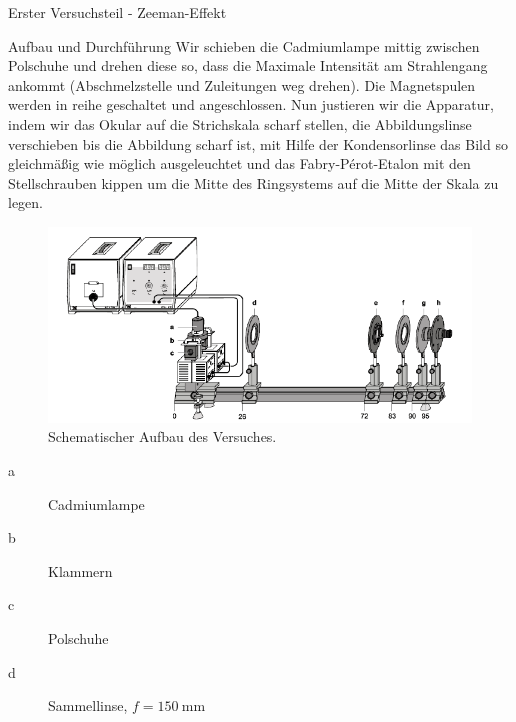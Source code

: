 \documentclass[pdftex, a4paper,11pt, twoside, ngerman]{report}
\begin{document}
         
         
  \begin{chapter}{Erster Versuchsteil - Zeeman-Effekt}
    \label{chp:Photoeffekt}
   
   
   
    \begin{section}{Aufbau und Durchführung}
      \label{chp:photoeffekt:sec:AufbauJustage}
      Wir schieben die Cadmiumlampe mittig zwischen Polschuhe und drehen diese
      so, dass die Maximale Intensität am Strahlengang ankommt (Abschmelzstelle
      und Zuleitungen weg drehen). Die Magnetspulen werden in reihe geschaltet
      und angeschlossen. Nun justieren wir die Apparatur, indem wir das Okular
      auf die Strichskala scharf stellen, die Abbildungslinse verschieben bis
      die Abbildung scharf ist, mit Hilfe der Kondensorlinse das Bild so
      gleichmäßig wie möglich ausgeleuchtet und das Fabry-Pérot-Etalon mit den
      Stellschrauben kippen um die Mitte des Ringsystems auf die Mitte der Skala
      zu legen.
      \begin{figure}[ht]
        \centering
        \includegraphics[width=\textwidth]
            {Figures/ZeemanAufbau.PNG}
        \caption{Schematischer Aufbau des Versuches.\cite{bib:Anleitung}}
        \label{fig:ZeemanAufbau}
      \end{figure}
      \newline
      \begin{minipage}{0.4\textwidth}
        \begin{description}
          \item[a] Cadmiumlampe
          \item[b] Klammern
          \item[c] Polschuhe
          \item[d] Sammellinse, $f=\SI{150}{\milli\meter}$

\end{description}
\end{minipage}
\end{section}
\end{chapter}
\end{document}
